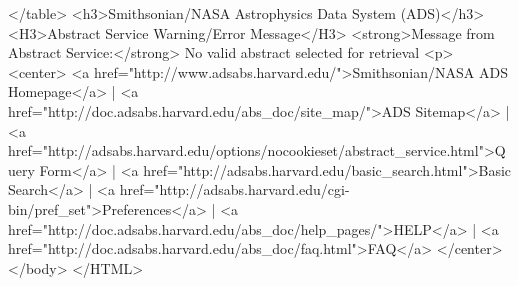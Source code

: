 </table>
<h3>Smithsonian/NASA Astrophysics Data System (ADS)</h3>
<H3>Abstract Service Warning/Error Message</H3>
<strong>Message from Abstract Service:</strong> No valid abstract selected for retrieval
<p>
<center>
<a href="http://www.adsabs.harvard.edu/">Smithsonian/NASA ADS Homepage</a> | <a href="http://doc.adsabs.harvard.edu/abs_doc/site_map/">ADS Sitemap</a> | <a href="http://adsabs.harvard.edu/options/nocookieset/abstract_service.html">Query Form</a> | <a href="http://adsabs.harvard.edu/basic_search.html">Basic Search</a> | <a href="http://adsabs.harvard.edu/cgi-bin/pref_set">Preferences</a> | <a href="http://doc.adsabs.harvard.edu/abs_doc/help_pages/">HELP</a> | <a href="http://doc.adsabs.harvard.edu/abs_doc/faq.html">FAQ</a>
</center>
</body>
</HTML>

